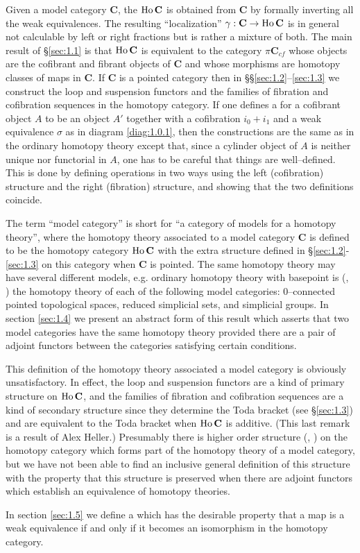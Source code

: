 \documentclass[../main]{subfiles}
\begin{document}
Given a model category $\mathbf{C}$, the  $\operatorname{Ho} \mathbf{C}$ is obtained from $\mathbf{C}$ by formally inverting all the weak equivalences. The resulting ``localization'' $\gamma : \mathbf{C} \to \operatorname{Ho} \mathbf{C}$ is in general not calculable by left or right fractions \cite{gabriel_calculus_1967} but is rather a mixture of both. The main result of \S\ref{sec:1.1} is that $\operatorname{Ho} \mathbf{C}$ is equivalent to the category $\pi {\mathbf{C}}_{cf}$ whose objects are the cofibrant and fibrant objects of $\mathbf{C}$ and whose morphisms are homotopy classes of maps in $\mathbf{C}$. If $\mathbf{C}$ is a pointed category then in \S\S\ref{sec:1.2}--\ref{sec:1.3} we construct the loop and suspension functors and the families of fibration and cofibration sequences in the homotopy category. If one defines a  for a cofibrant object $A$ to be an object $A'$ together with a cofibration $i_0 + i_1$ and a weak equivalence $\sigma$ as in diagram \ref{diag:1.0.1}, then the constructions are the same as in the ordinary homotopy theory except that, since a cylinder object of $A$ is neither unique nor functorial in $A$, one has to be careful that things are well--defined. This is done by defining operations in two ways using the left (cofibration) structure and the right (fibration) structure, and showing that the two definitions coincide.

The term ``model category'' is short for ``a category of models for a homotopy theory'', where the homotopy theory associated to a model category $\mathbf{C}$ is defined to be the homotopy category $\operatorname{Ho} \mathbf{C}$ with the extra structure defined in \S\ref{sec:1.2}-\ref{sec:1.3} on this category when $\mathbf{C}$ is pointed. The same homotopy theory may have several different models, e.g. ordinary homotopy theory with basepoint is (\cite{kan_homotopy_1958}, \cite{milnor_geometric_1957}) the homotopy theory of each of the following model categories: $0$--connected pointed topological spaces, reduced simplicial sets, and simplicial groups. In section \ref{sec:1.4} we present an abstract form of this result which asserts that two model categories have the same homotopy theory provided there are a pair of adjoint functors between the categories satisfying certain conditions.

This definition of the homotopy theory associated a model category is obviously unsatisfactory. In effect, the loop and suspension functors are a kind of primary structure on $\operatorname{Ho} \mathbf{C}$, and the families of fibration and cofibration sequences are a kind of secondary structure since they determine the Toda bracket (see \S\ref{sec:1.3}) and are equivalent to the Toda bracket when $\operatorname{Ho} \mathbf{C}$ is additive. (This last remark is a result of Alex Heller.) Presumably there is higher order structure (\cite{gershenson_higher_1965}, \cite{spanier_higher_1963}) on the homotopy category which forms part of the homotopy theory of a model category, but we have not been able to find an inclusive general definition of this structure with the property that this structure is preserved when there are adjoint functors which establish an equivalence of homotopy theories.

In section \ref{sec:1.5} we define a  which has the desirable property that a map is a weak equivalence if and only if it becomes an isomorphism in the homotopy category.
\end{document}
